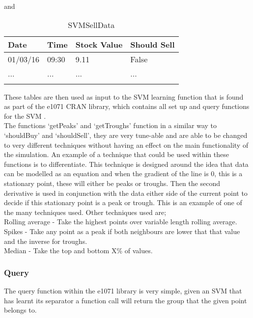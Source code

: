 \documentclass[12pt,a4paper]{article}
\begin{document}
and

\label{units}
\begin{longtable}{ |p{2.25cm}|p{2.25cm}|p{2.25cm}|p{2.25cm}| }\hline\hline
Date & Time & Stock Value & Should Sell \\ \hline
01/03/16 & 09:30 & 9.11 & False  \\ \hline
... & ... & ... & ...  \\ \hline
\caption{SVMSellData}
\end{longtable}

These tables are then used as input to the SVM learning function that is found as part of the e1071 CRAN library, which contains all set up and query functions for the SVM \cite{Meyer2017}.\\

The functions `getPeaks' and `getTroughs' function in a similar way to `shouldBuy' and `shouldSell', they are very tune-able and are able to be changed to very different techniques without having an effect on the main functionality of the simulation. An example of a technique that could be used within these functions is to differentiate. This technique is designed around the idea that data can be modelled as an equation and when the gradient of the line is 0, this is a stationary point, these will either be peaks or troughs. Then the second derivative is used in conjunction with the data either side of the current point to decide if this stationary point is a peak or trough. This is an example of one of the many techniques used. Other techniques used are; \\

\noindent
Rolling average - Take the highest points over variable length rolling average. \\
Spikes - Take any point as a peak if both neighbours are lower that that value and the inverse for troughs. \\
Median - Take the top and bottom X\% of values. 

\subsubsection*{Query}

The query function within the e1071 library is very simple, given an SVM that has learnt its separator a function call will return the group that the given point belongs to.
\end{document}
